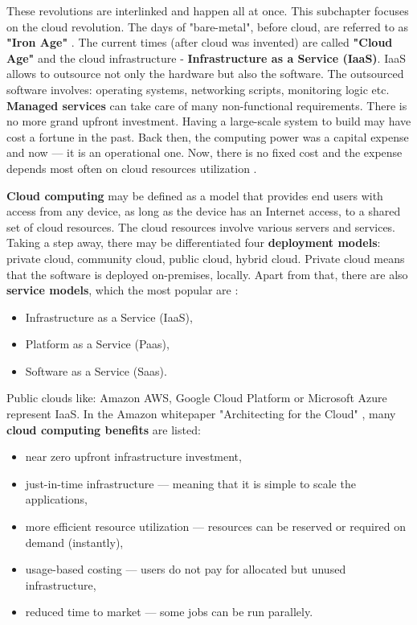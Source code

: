 These revolutions are interlinked and happen all at once. This subchapter focuses on the cloud revolution. The days of "bare-metal", before cloud, are referred to as \textbf{"Iron Age"} \cite{book-cndwk,book-iac}. The current times (after cloud was invented) are called \textbf{"Cloud Age"} and the cloud infrastructure - \textbf{Infrastructure as a Service (IaaS)}. IaaS allows to outsource not only the hardware but also the software. The outsourced software involves: operating systems, networking scripts, monitoring logic etc. \textbf{Managed services} can take care of many non-functional requirements. There is no more grand upfront investment. Having a large-scale system to build may have cost a fortune in the past. Back then, the computing power was a capital expense and now --- it is an operational one. Now, there is no fixed cost and the expense depends most often on cloud resources utilization \cite{book-cndwk, article-aws-architecting}.

\textbf{Cloud computing} may be defined as a model that provides end users with access from any device, as long as the device has an Internet access, to a shared set of cloud resources. The cloud resources involve various servers and services. Taking a step away, there may be differentiated four \textbf{deployment models}: private cloud, community cloud, public cloud, hybrid cloud. Private cloud means that the software is deployed on-premises, locally. Apart from that, there are also \textbf{service models}, which the most popular are \cite{article-poni-cloud}:
\begin{itemize}
\item Infrastructure as a Service (IaaS),
\item Platform as a Service (Paas),
\item Software as a Service (Saas).
\end{itemize}

Public clouds like: Amazon AWS, Google Cloud Platform or Microsoft Azure represent IaaS. In the Amazon whitepaper "Architecting for the Cloud" \cite{article-aws-architecting}, many \textbf{cloud computing benefits} are listed:
\begin{itemize}
\item near zero upfront infrastructure investment,
\item just-in-time infrastructure --- meaning that it is simple to scale the applications,
\item more efficient resource utilization --- resources can be reserved or required on demand (instantly),
\item usage-based costing --- users do not pay for allocated but unused infrastructure,
\item reduced time to market --- some jobs can be run parallely.
\end{itemize}

